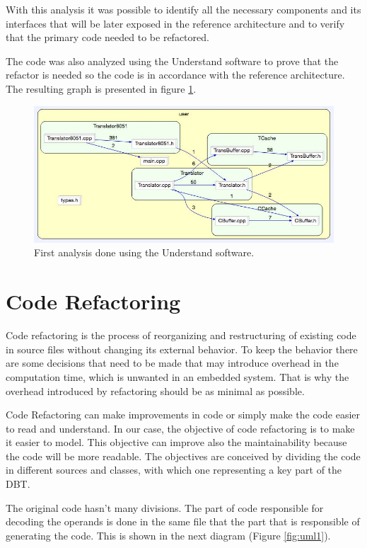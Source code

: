 \documentclass{report}
\begin{document}
	\par With this analysis it was possible to identify all the necessary components and its interfaces that will be later exposed in the reference architecture and to verify that the primary code needed to be refactored.

	\par The code was also analyzed using the Understand software to prove that the refactor is needed so the code is in accordance with the reference architecture. The resulting graph is presented in figure \ref{fig:understand1}.
	
	\begin{figure} [H]
		\centering
		\includegraphics[width=0.6\linewidth]{Images/refactor1.jpg}
		\caption{First analysis done using the Understand software.}
		\label{fig:understand1}
	\end{figure}

	\section{Code Refactoring}
	Code refactoring is the process of reorganizing and restructuring of existing code in source files without changing its external behavior. To keep the behavior there are some decisions that need to be made that may introduce overhead in the computation time, which is unwanted in an embedded system. That is why the overhead introduced by refactoring should be as minimal as possible.
	
	Code Refactoring can make improvements in code or simply make the code easier to read and understand.
	In our case, the objective of code refactoring is to make it easier to model. This objective can improve also the maintainability because the code will be more readable. The objectives are conceived by dividing the code in different sources and classes, with which one representing a key part of the DBT.
	
	The original code hasn't many divisions. The part of code responsible for decoding the operands is done in the same file that the part that is responsible of generating the code. 
	This is shown in the next diagram (Figure \ref{fig:uml1}).
	
\end{document}
